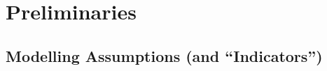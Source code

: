 \documentclass[conference,10pt]{IEEEtran}
\begin{document}

 
 

\section{Preliminaries} 


\subsection{Modelling Assumptions (and ``Indicators'')}\label{model}
\end{document}

